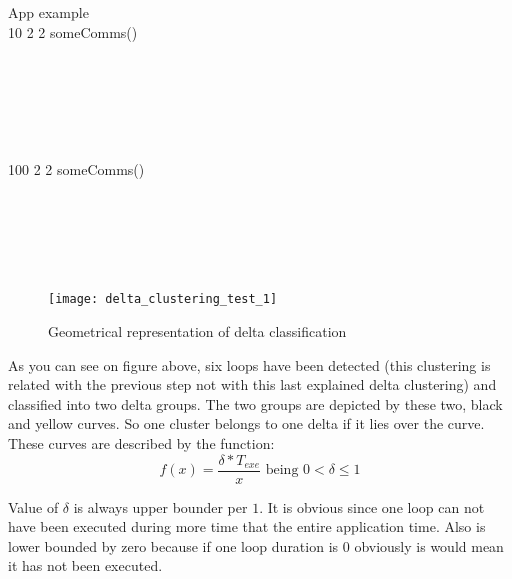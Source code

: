 \begin{multicols}{2}
  \begin{pseudocode}{App example}{ }
  \label{pc:delta_classification_example}
      \\
        10 \DO 
      \BEGIN 
          2 \DO
        \BEGIN 
            2 \DO
          \BEGIN 
              someComms() \\
          \END \\
           \\
        \END \\
         \\
      \END \\
      
      \\
        100 \DO
      \BEGIN 
          2 \DO
        \BEGIN 
            2 \DO
          \BEGIN 
              someComms()\\
          \END \\
           \\
        \END \\
         \\
      \END \\
  \end{pseudocode}
  \columnbreak
  \vfill \null
  \begin{figure}[H]
    \centering
    \texttt{[image: delta\_clustering\_test\_1]}
    \caption{Geometrical representation of delta classification}
    \label{fig:delta_classification_1}
  \end{figure}
  \vfill \null
\end{multicols}

As you can see on figure above, six loops have been detected (this clustering is
related with the previous step not with this last explained delta clustering) 
and classified into two delta groups. The two groups are depicted by these two,
black and yellow curves. So one cluster belongs to one delta if it lies over 
the curve. These curves are described by the function:
\begin{equation}
f(x)=\frac{\delta*T_{exe}}{x} \text{ being }  0 < \delta \leq 1
\end{equation}

Value of $\delta$ is always upper bounder per $1$. It is obvious since one loop
can not have been executed during more time that the entire application time.
Also is lower bounded by zero because if one loop duration is 0 obviously is
would mean it has not been executed. 

